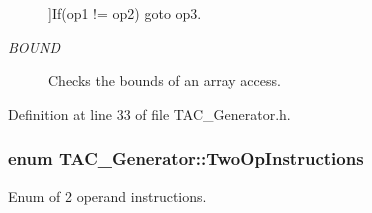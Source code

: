 \begin{Desc}
\begin{description}
{}]If(op1 != op2) goto op3. \item[{\em 
\hypertarget{classTAC__Generator_ae032b80a215a10604c5273b65e7dab4ca0fe34906704a5f10788014753af64d88}{B\-O\-U\-N\-D}\label{classTAC__Generator_ae032b80a215a10604c5273b65e7dab4ca0fe34906704a5f10788014753af64d88}
}]Checks the bounds of an array access. \end{description}
\end{Desc}


Definition at line 33 of file T\-A\-C\-\_\-\-Generator.\-h.

\hypertarget{classTAC__Generator_a4e5a63c4a55a85d34f6ffebe5bf48129}{
\subsubsection[{Two\-Op\-Instructions}]{\setlength{\rightskip}{0pt plus 5cm}enum {\bf T\-A\-C\-\_\-\-Generator\-::\-Two\-Op\-Instructions}}}\label{classTAC__Generator_a4e5a63c4a55a85d34f6ffebe5bf48129}


Enum of 2 operand instructions. 

